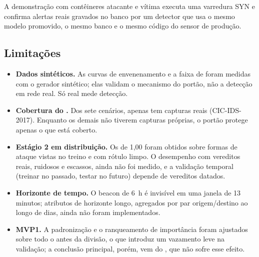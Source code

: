 A demonstração com contêineres atacante e vítima executa uma varredura
 SYN e confirma alertas reais gravados no banco por um detector que usa
o mesmo modelo promovido, o mesmo banco e o mesmo código do sensor de produção.

\subsection{Limitações}

\begin{itemize}
  \item \textbf{Dados sintéticos.} As curvas de envenenamento e a faixa de
   foram medidas com o gerador sintético; elas validam o
  mecanismo do portão, não a detecção em rede real. Só  real mede
  detecção.
  \item \textbf{Cobertura do .} Dos sete cenários, apenas
   tem capturas reais (CIC-IDS-2017). Enquanto os demais não
  tiverem capturas próprias, o portão protege apenas o que está coberto.
  \item \textbf{Estágio 2 em distribuição.} Os  de 1,00 foram obtidos
  sobre formas de ataque vistas no treino e com rótulo limpo. O desempenho com
  vereditos reais, ruidosos e escassos, ainda não foi medido, e a validação temporal
  (treinar no passado, testar no futuro) depende de vereditos datados.
  \item \textbf{Horizonte de tempo.} O beacon de 6~h é invisível em uma janela de
  13 minutos; atributos de horizonte longo, agregados por par origem/destino ao
  longo de dias, ainda não foram implementados.
  \item \textbf{MVP1.} A padronização e o ranqueamento de importância foram
  ajustados sobre todo o  antes da divisão, o que introduz um
  vazamento leve na validação; a conclusão principal, porém, vem do
  , que não sofre esse efeito.
\end{itemize}
